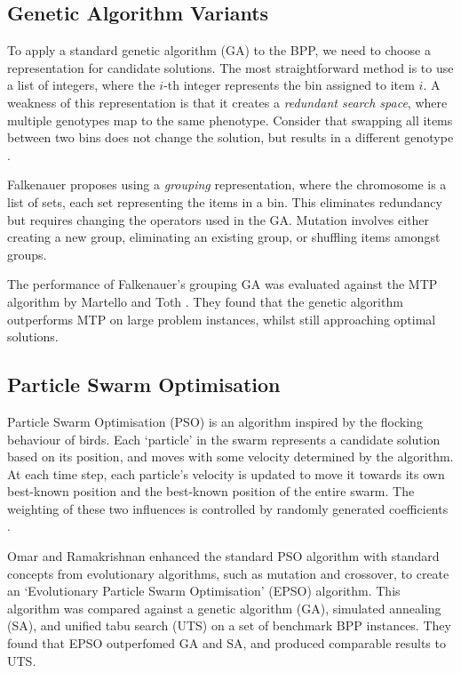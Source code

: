 \documentclass[conference]{IEEEtran}
\begin{document}
\subsection{Genetic Algorithm Variants}
To apply a standard genetic algorithm (GA) to the BPP, we need to choose a representation for candidate solutions. The most straightforward method is to use a list of integers, where the \(i\)-th integer represents the bin assigned to item \(i\). A weakness of this representation is that it creates a \textit{redundant search space}, where multiple genotypes map to the same phenotype. Consider that swapping all items between two bins does not change the solution, but results in a different genotype \cite{falkenauer1996hybrid}.

Falkenauer \cite{falkenauer1996hybrid} proposes using a \textit{grouping} representation, where the chromosome is a list of sets, each set representing the items in a bin. This eliminates redundancy but requires changing the operators used in the GA. Mutation involves either creating a new group, eliminating an existing group, or shuffling items amongst groups.

The performance of Falkenauer's grouping GA was evaluated against the MTP algorithm by Martello and Toth \cite{falkenauer1996hybrid}. They found that the genetic algorithm outperforms MTP on large problem instances, whilst still approaching optimal solutions.

\subsection{Particle Swarm Optimisation}
Particle Swarm Optimisation (PSO) is an algorithm inspired by the flocking behaviour of birds. Each `particle' in the swarm represents a candidate solution based on its position, and moves with some velocity determined by the algorithm. At each time step, each particle's velocity is updated to move it towards its own best-known position and the best-known position of the entire swarm. The weighting of these two influences is controlled by randomly generated coefficients \cite{omar2013solving}.

Omar and Ramakrishnan \cite{omar2013solving} enhanced the standard PSO algorithm with standard concepts from evolutionary algorithms, such as mutation and crossover, to create an `Evolutionary Particle Swarm Optimisation' (EPSO) algorithm. This algorithm was compared against a genetic algorithm (GA), simulated annealing (SA), and unified tabu search (UTS) on a set of benchmark BPP instances. They found that EPSO outperfomed GA and SA, and produced comparable results to UTS.
\end{document}
